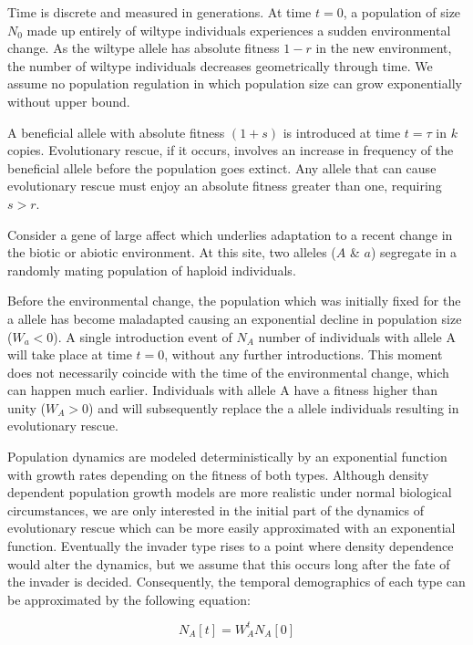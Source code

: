 \documentclass[a4paper,10pt]{article}
\begin{document}
    Time is discrete and measured in generations. At time $t=0$, a population of size $N_0$ made up entirely of wiltype individuals experiences a sudden environmental change. As the wiltype allele has absolute fitness $1-r$ in the new environment, the number of wiltype individuals decreases geometrically through time. We assume no population regulation in which population size can grow exponentially without upper bound. 
    
    A beneficial allele with absolute fitness $(1+s)$ is introduced at time $t=\tau$ in $k$ copies. Evolutionary rescue, if it occurs, involves an increase in frequency of the beneficial allele before the population goes extinct. Any allele that can cause evolutionary rescue must enjoy an absolute fitness greater than one, requiring $s>r$. 
    
    
    
    
    Consider a gene of large affect which underlies adaptation to a recent change in the biotic or abiotic environment. At this site, two alleles ($A$ \& $a$) segregate in a randomly mating population of haploid individuals.
    
    Before the environmental change, the population which was initially fixed for the a allele has become maladapted causing an exponential decline in population size ($W_a<0$). A single introduction event of $N_A$ number of individuals with allele A will take place at time $t=0$, without any further introductions. This moment does not necessarily coincide with the time of the environmental change, which can happen much earlier. Individuals with allele A have a fitness higher than unity ($W_A>0$) and will subsequently replace the a allele individuals resulting in evolutionary rescue.
    
    Population dynamics are modeled deterministically by an exponential function with growth rates depending on the fitness of both types. Although density dependent population growth models are more realistic under normal biological circumstances, we are only interested in the initial part of the dynamics of evolutionary rescue which can be more easily approximated with an exponential function. Eventually the invader type rises to a point where density dependence would alter the dynamics, but we assume that this occurs long after the fate of the invader is decided. Consequently, the temporal demographics of each type can be approximated by the following equation:
    
    \begin{equation}
	N_A[t] = W_A^t N_A[0] 
	\label{Eq N}
	\end{equation}
    
\end{document}
